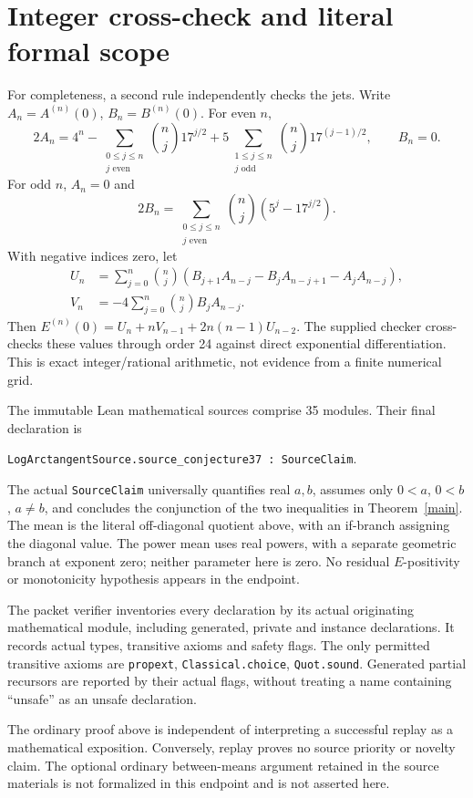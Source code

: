 \documentclass[11pt]{article}
\begin{document}
\section{Integer cross-check and literal formal scope}
For completeness, a second rule independently checks the jets. Write $A_n=A^{(n)}(0)$, $B_n=B^{(n)}(0)$. For even $n$,
\[
2A_n=4^n-\sum_{\substack{0\le j\le n\\j\text{ even}}}\binom nj17^{j/2}
 +5\sum_{\substack{1\le j\le n\\j\text{ odd}}}\binom nj17^{(j-1)/2},\qquad B_n=0.
\]
For odd $n$, $A_n=0$ and
\[
 2B_n=\sum_{\substack{0\le j\le n\\j\text{ even}}}\binom nj(5^j-17^{j/2}).
\]
With negative indices zero, let
\begin{align*}
 U_n&=\sum_{j=0}^n\binom nj
 (B_{j+1}A_{n-j}-B_jA_{n-j+1}-A_jA_{n-j}),\\
 V_n&=-4\sum_{j=0}^n\binom njB_jA_{n-j}.
\end{align*}
Then $E^{(n)}(0)=U_n+nV_{n-1}+2n(n-1)U_{n-2}$. The supplied checker cross-checks these values through order 24 against direct exponential differentiation. This is exact integer/rational arithmetic, not evidence from a finite numerical grid.

The immutable Lean mathematical sources comprise 35 modules. Their final declaration is
\begin{center}
\texttt{LogArctangentSource.source\_conjecture37 : SourceClaim}.
\end{center}
The actual \texttt{SourceClaim} universally quantifies real $a,b$, assumes only $0<a$, $0<b$, $a\ne b$, and concludes the conjunction of the two inequalities in Theorem~\ref{main}. The mean is the literal off-diagonal quotient above, with an if-branch assigning the diagonal value. The power mean uses real powers, with a separate geometric branch at exponent zero; neither parameter here is zero. No residual $E$-positivity or monotonicity hypothesis appears in the endpoint.

The packet verifier inventories every declaration by its actual originating mathematical module, including generated, private and instance declarations. It records actual types, transitive axioms and safety flags. The only permitted transitive axioms are \texttt{propext}, \texttt{Classical.choice}, \texttt{Quot.sound}. Generated partial recursors are reported by their actual flags, without treating a name containing ``unsafe'' as an unsafe declaration.

The ordinary proof above is independent of interpreting a successful replay as a mathematical exposition. Conversely, replay proves no source priority or novelty claim. The optional ordinary between-means argument retained in the source materials is not formalized in this endpoint and is not asserted here.
\newpage
\end{document}
